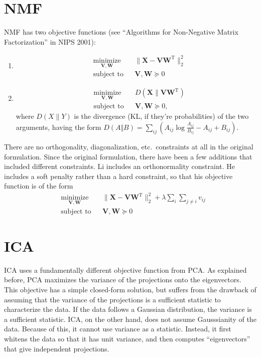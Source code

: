 \documentclass{article}
\newcommand{\transpose}{^\mathrm{T}}
\begin{document}
\section*{NMF}
NMF has two objective functions (see ``Algorithms for Non-Negative Matrix Factorization'' in NIPS 2001):
\begin{enumerate}
\item \begin{equation}
\begin{aligned}
&\underset{\mathbf{V}, \mathbf{W}}{\text{minimize}} &&\| \mathbf{X} - \mathbf{VW}\transpose\|_2^2 \\ 
& \text{subject to} & &\mathbf{V,W} \succeq 0 
\end{aligned}
\end{equation}
\item
\begin{equation}
\begin{aligned}
&\underset{\mathbf{V}, \mathbf{W}}{\text{minimize}} && D\left(\mathbf{X} \|  \mathbf{VW}\transpose\right) \\ 
& \text{subject to} & &\mathbf{V,W} \succeq 0, 
\end{aligned}
\end{equation}
where $D\left(X\|Y\right)$ is the divergence (KL, if they're probabilities) of the two arguments, having the form $D\left(A\Vert B\right)=\sum_{ij}\left(A_{ij}\log\frac{A_{ij}}{B_{ij}} - A_{ij} + B_{ij}\right)$.
\end{enumerate}
There are no orthogonality, diagonalization, etc.\ constraints at all in the original formulation.  Since the original formulation, there have been a few additions that included different constraints. Li \cite{li_learning_2001} includes an orthonormality constraint.  He includes a soft penalty rather than a hard constraint, so that his objective function is of the form 
\begin{equation}
\begin{aligned}
&\underset{\mathbf{V}, \mathbf{W}}{\text{minimize}} &&\| \mathbf{X} - \mathbf{VW}\transpose\|_2^2 + \lambda \sum_i \sum_{j \neq i} v_{ij}\\  
& \text{subject to} & &\mathbf{V,W} \succeq 0 
\end{aligned}
\end{equation}

\section*{ICA}
ICA uses a fundamentally different objective function from PCA. As explained before,  PCA maximizes the variance of the projections onto the eigenvectors.  This objective has a simple closed-form solution, but suffers from the drawback of assuming that the variance of the projections is a sufficient statistic to characterize the data.  If the data follows a Gaussian distribution, the variance is a sufficient statistic.  ICA, on the other hand, does not assume Gausssianity of the data.  Because of this, it cannot use variance as a statistic.  Instead, it first whitens the data so that it has unit variance, and then computes ``eigenvectors'' that give independent projections. 
\end{document}
